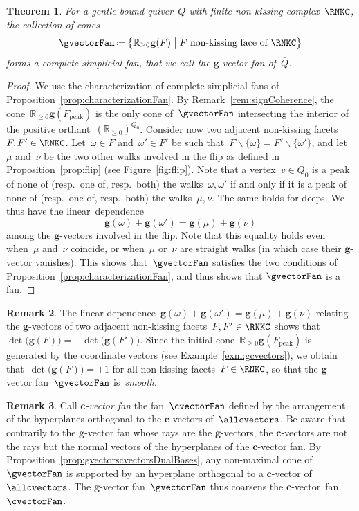 \documentclass{amsart}
\newtheorem{theorem}{Theorem}[part]
\theoremstyle{definition}
\newtheorem{remark}[theorem]{Remark}
\newcommand{\R}{\mathbb{R}} %
\renewcommand{\b}[1]{\mathbf{#1}} %
\newcommand{\bigset}[2]{\big\{ #1 \;\big|\; #2 \big\}} %
\newcommand{\ssm}{\smallsetminus} %
\newcommand{\eqdef}{\mbox{\,\raisebox{0.2ex}{\scriptsize\ensuremath{\mathrm:}}\ensuremath{=}\,}} %
\newcommand{\fref}[1]{Figure~\ref{#1}} %
\newcommand{\darkblue}{\color{darkblue}} %
\newcommand{\defn}[1]{\textsl{\darkblue #1}} %
\newcommand{\peak}{\mathrm{peak}} %
\newcommand{\gvector}[1]{\mathbf{g}(#1)} %
\newcommand{\gvectors}[1]{\mathbf{g}(#1)} %
\begin{document}
\begin{theorem}
\label{thm:gvectorFan}
For a gentle bound quiver~$\bar Q$ with finite non-kissing complex~$\RNKC$, the collection of cones
\[
\gvectorFan \eqdef \bigset{\R_{\ge0} \gvectors{F}}{F \text{ non-kissing face of } \RNKC}
\]
forms a complete simplicial fan, that we call the \defn{$\b{g}$-vector fan} of~$\bar Q$.
\end{theorem}

\begin{proof}
We use the characterization of complete simplicial fans of Proposition~\ref{prop:characterizationFan}.
By Remark~\ref{rem:signCoherence}, the cone~$\R_{\ge0} \gvectors{F_\peak}$ is the only cone of~$\gvectorFan$ intersecting the interior of the positive orthant~$(\R_{\ge0})^{Q_0}$.
Consider now two adjacent non-kissing facets~$F,F' \in \RNKC$.
Let~$\omega \in F$ and~$\omega' \in F'$ be such that~${F \ssm \{\omega\} = F' \ssm \{\omega'\}}$, and let~$\mu$ and~$\nu$ be the two other walks involved in the flip as defined in Proposition~\ref{prop:flip} (see \fref{fig:flip}).
Note that a vertex~$v \in Q_0$ is a peak of none of (resp.~one of, resp.~both) the walks~$\omega, \omega'$ if and only if it is a peak of none of (resp.~one of, resp.~both) the walks~$\mu, \nu$.
The same holds for deeps.
We thus have the linear~dependence
\[
\gvector{\omega} + \gvector{\omega'} = \gvector{\mu} + \gvector{\nu}
\]
among the $\b{g}$-vectors involved in the flip.
Note that this equality holds even when~$\mu$ and~$\nu$ coincide, or when~$\mu$ or~$\nu$ are straight walks (in which case their $\b{g}$-vector vanishes).
This shows that~$\gvectorFan$ satisfies the two conditions of Proposition~\ref{prop:characterizationFan}, and thus shows that $\gvectorFan$ is a fan.
\end{proof}

\begin{remark}
The linear dependence~$\gvector{\omega} + \gvector{\omega'} = \gvector{\mu} + \gvector{\nu}$ relating the $\b{g}$-vectors of two adjacent non-kissing facets~$F,F' \in \RNKC$ shows that~${\det \big( \gvector{F} \big) = - \det \big( \gvector{F'} \big)}$.
Since the initial cone~$\R_{\ge0} \gvectors{F_\peak}$ is generated by the coordinate vectors (see Example~\ref{exm:gcvectors}), we obtain that~$\det \big( \gvector{F} \big) = \pm 1$ for all non-kissing facets~$F \in \RNKC$, so that the $\b{g}$-vector fan~$\gvectorFan$ is~\defn{smooth}.
\end{remark}

\begin{remark}
\label{rem:cvectorFan}
Call \defn{$\b{c}$-vector fan} the fan~$\cvectorFan$ defined by the arrangement of the hyperplanes orthogonal to the $\b{c}$-vectors of~$\allcvectors$.
Be aware that contrarily to the $\b{g}$-vector fan whose rays are the $\b{g}$-vectors, the $\b{c}$-vectors are not the rays but the normal vectors of the hyperplanes of the $\b{c}$-vector fan.
By Proposition~\ref{prop:gvectorscvectorsDualBases}, any non-maximal cone of~$\gvectorFan$ is supported by an hyperplane orthogonal to a $\b{c}$-vector of~$\allcvectors$.
The $\b{g}$-vector fan~$\gvectorFan$ thus coarsens the $\b{c}$-vector~fan~$\cvectorFan$.
\end{remark}
\end{document}
